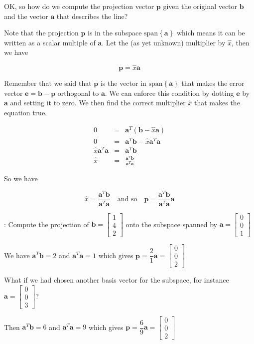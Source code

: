 \documentclass[12pt]{article}
\newcommand{\nin}{\noindent}
\newcommand{\nn}{\nonumber}
\newcommand{\vthree}{\vspace{3mm}}
\newcommand{\myp}[1]{\left( #1 \right)}
\newcommand{\mys}[1]{\left\{ #1 \right\}}
\newcommand{\beq}{\begin{eqnarray}}
\newcommand{\eeq}{\end{eqnarray}}
\newcommand{\mymat}[1]{
\left[
\begin{array}{rrrrrrrrrrrrrrrrrrrrrrrrrrrrrrrrrrrrrrr}
#1
\end{array}
\right]
}
\newcommand{\bp}{\mathbf{p}}
\newcommand{\ba}{\mathbf{a}}
\newcommand{\bb}{\mathbf{b}}
\newcommand{\be}{\mathbf{e}}
\newcommand{\bfb}{\mathbf{b}}
\begin{document}
\vthree

\nin OK, so how do we compute the projection vector $\bp$ given the original vector $\bfb$ and the vector $\ba$ that describes the line?

\vthree

\nin Note that the projection $\bp$ is in the subspace $\textrm{span}\mys{\ba}$ which means it can be written as a scalar multiple of $\ba$.  Let the (as yet unknown) multiplier by $\hat{x}$, then we have

\[
\bp = \hat{x}\ba
\]

\nin Remember that we said that $\bp$ is the vector in $\textrm{span}\mys{\ba}$ that makes the error vector $\be = \bfb - \bp$ orthogonal to $\ba$.  We can enforce this condition by dotting $\be$ by $\ba$ and setting it to zero.  We then find the correct multiplier $\hat{x}$ that makes the equation true.

\beq
\nn 0 &=& \ba^T\myp{\bfb - \hat{x}\ba} \\
\nn 0 &=& \ba^T\bfb - \hat{x}\ba^T\ba \\
\nn \hat{x}\ba^T\ba &=& \ba^T\bfb \\
\nn \hat{x} &=& \frac{\ba^T\bfb}{\ba^T\ba}
\eeq

\vthree

\nin So we have

\[
\hat{x} = \frac{\ba^T\bfb}{\ba^T\ba} \quad \textrm{and so} \quad \bp = \frac{\ba^T\bfb}{\ba^T\ba} \ba
\]

\vthree

\nin {\bf Example 2}: Compute the projection of $\bfb = \mymat{1 \\ 4 \\ 2}$ onto the subspace spanned by $\ba = \mymat{0 \\ 0 \\ 1}$

\vthree

\nin We have $\ba^T\bb = 2$ and $\ba^T\ba = 1$ which gives $\bp = \dfrac{2}{1}\ba = \mymat{0 \\ 0 \\ 2}$

\vthree

\nin What if we had chosen another basis vector for the subspace, for instance $\ba = \mymat{0 \\ 0 \\ 3}$?

\vthree

\nin Then $\ba^T\bb = 6$ and $\ba^T\ba = 9$ which gives $\bp = \dfrac{6}{9}\ba = \mymat{0 \\ 0 \\ 2}$
\end{document}
